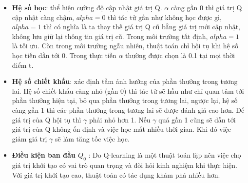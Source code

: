 \documentclass[14pt,a4paper,oneside]{report}		%
\begin{document}
\begin{itemize}
\item \textbf{Hệ số học}: thể hiện cường độ cập nhật giá trị Q. $\alpha$ càng gần 0 thì giá trị Q cập nhật càng chậm, $alpha = 0$ thì tác tử gần như không học được gì, $alpha = 1$ thì có nghĩa là ta thay thế giá trị Q cũ bằng giá trị mới cập nhật, không lưu giữ lại thông tin giá trị cũ. Trong môi trường tất định, $alpha=1$ là tối ưu. Còn trong môi trường ngẫu nhiên, thuật toán chỉ hội tụ khi hệ số học tiến dần tới 0. Trong thực tiễn $\alpha$ thường được chọn là 0.1 tại mọi thời điểm t.
\item \textbf{Hệ số chiết khấu}: xác định tầm ảnh hưởng của phần thưởng trong tương lai. Hệ số chiết khấu càng nhỏ (gần 0) thì tác tử sẽ hầu như chỉ quan tâm tới phần thưởng hiện tại, bỏ qua phần thưởng trong tương lai, ngược lại, hệ số càng gần 1 thì các phần thưởng trong tương lai sẽ được đánh giá cao hơn. Để giá trị của Q hội tụ thì $\gamma$ phải nhỏ hơn 1. Nếu $\gamma$ quá gần 1 cũng sẽ dẫn tới giá trị của Q không ổn định và việc học mất nhiều thời gian. Khi đó việc giảm giá trị $\gamma$ sẽ làm tăng tốc việc học.
\item \textbf{Điều kiện ban đầu $Q_0$} : Do Q-learning là một thuật toán lặp nên việc chọ giá trị khởi tạo có vai trò quan trọng và đòi hỏi kinh nghiệm khi thực hiện. Với giá trị khởi tạo cao, thuật toán có tác dụng khám phá nhiều hơn.
\end{itemize} 
\end{document}
